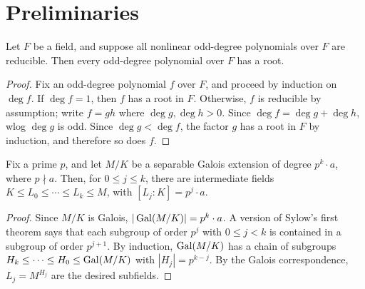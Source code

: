 %

\section{Preliminaries}

\begin{lemma}
  \label{lem:odd_deg_red_imp_root}
  Let $F$ be a field, and suppose all nonlinear odd-degree polynomials over $F$ are reducible. Then every odd-degree polynomial over $F$ has a root.
\end{lemma}
\begin{proof}
  Fix an odd-degree polynomial $f$ over $F$, and proceed by induction on $\deg f$. If $\deg f=1$, then $f$ has a root in $F$. Otherwise, $f$ is reducible by assumption; write $f=gh$ where $\deg g,\deg h>0$. Since $\deg f=\deg g+\deg h$, wlog $\deg g$ is odd. Since $\deg g<\deg f$, the factor $g$ has a root in $F$ by induction, and therefore so does $f$.
\end{proof}

\begin{lemma}
  \label{lem:sylow_galois}
  Fix a prime $p$, and let $M/K$ be a separable Galois extension of degree $p^k\cdot a$, where $p\nmid a$. Then, for $0\leq j\leq k$, there are intermediate fields $K\leq L_0\leq\cdots\leq L_k\leq M$, with $[L_j:K]=p^j\cdot a$.
\end{lemma}
\begin{proof}
  Since $M/K$ is Galois, $|\operatorname{Gal}(M/K)|=p^k\cdot a$. A version of Sylow's first theorem says that each subgroup of order $p^j$ with $0\leq j<k$ is contained in a subgroup of order $p^{j+1}$. By induction, $\operatorname{Gal}(M/K)$ has a chain of subgroups $H_k\leq\cdots\leq H_0\leq \operatorname{Gal}(M/K)$ with $|H_j|=p^{k-j}$. By the Galois correspondence, $L_j=M^{H_j}$ are the desired subfields.
\end{proof}

